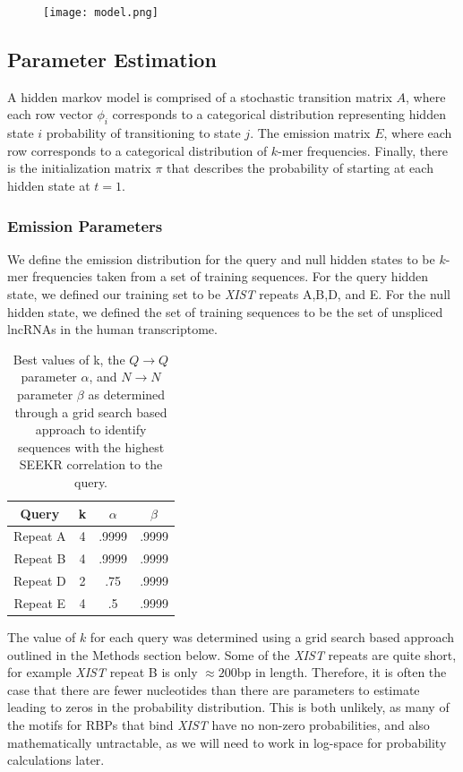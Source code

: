 \begin{figure}[h]
\centering
\texttt{[image: model.png]}
\caption{}
\end{figure}

\subsection{Parameter Estimation}
A hidden markov model is comprised of a stochastic transition matrix $A$, where each row vector $\phi_i$ corresponds to a categorical distribution representing hidden state $i$ probability of transitioning to state $j$. The emission matrix $E$, where each row corresponds to a categorical distribution of $k$-mer frequencies. Finally, there is the initialization matrix $\pi$ that describes the probability of starting at each hidden state at $t=1$.
\subsubsection{Emission Parameters}
We define the emission distribution for the query and null hidden states to be $k$-mer frequencies taken from a set of training sequences. For the query hidden state, we defined our training set to be \emph{XIST} repeats A,B,D, and E. For the null hidden state, we defined the set of training sequences to be the set of unspliced lncRNAs in the human transcriptome. 

\begin{table}[h]
\centering
\begin{center}
 \begin{tabular}{|c | c| c | c |} 
 \hline
 Query & k & $\alpha$ & $\beta$ \\
 \hline\hline
 Repeat A & 4 & .9999 & .9999 \\ 
 \hline
 Repeat B & 4 & .9999 & .9999\\
 \hline
 Repeat D & 2 & .75 & .9999\\
 \hline
 Repeat E & 4 & .5 & .9999\\
 \hline
\end{tabular}
\end{center}
\caption{Best values of k, the $Q\rightarrow Q$ parameter $\alpha$, and $N\rightarrow N$ parameter $\beta$ as determined through a grid search based approach to identify sequences with the highest SEEKR correlation to the query.}
\label{table:1}
\end{table}

The value of $k$ for each query was determined using a grid search based approach outlined in the Methods section below. Some of the \emph{XIST} repeats are quite short, for example \emph{XIST} repeat B is only $\approx 200$bp in length. Therefore, it is often the case that there are fewer nucleotides than there are parameters to estimate leading to zeros in the probability distribution. This is both unlikely, as many of the motifs for RBPs that bind \emph{XIST} have no non-zero probabilities, and also mathematically untractable, as we will need to work in log-space for probability calculations later.

